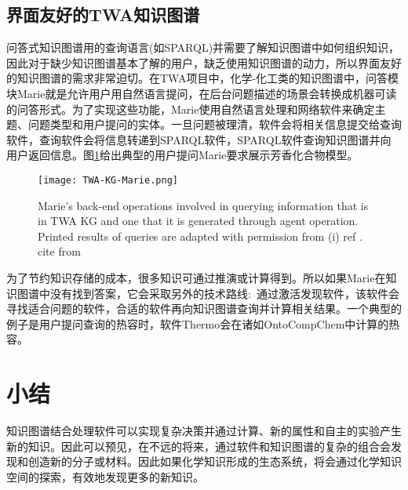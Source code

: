 \subsection{界面友好的\rm{TWA}知识图谱}
问答式知识图谱用的查询语言(如\textrm{SPARQL})并需要了解知识图谱中如何组织知识，因此对于缺少知识图谱基本了解的用户，缺乏使用知识图谱的动力，所以界面友好的知识图谱的需求非常迫切。在\textrm{TWA}项目中，化学-化工类的知识图谱中，问答模块\textrm{Marie}就是允许用户用自然语言提问，在后台问题描述的场景会转换成机器可读的问答形式。为了实现这些功能，\textrm{Marie}使用自然语言处理和网络软件来确定主题、问题类型和用户提问的实体。一旦问题被理清，软件会将相关信息提交给查询软件，查询软件会将信息转递到\textrm{SPARQL}软件，\textrm{SPARQL}软件查询知识图谱并向用户返回信息。图\ref{Fig:TWA-KG-Marie}给出典型的用户提问\textrm{Marie}要求展示芳香化合物模型。
\begin{figure}[h!]
\centering
\texttt{[image: TWA-KG-Marie.png]}
\caption{\small\textrm{Marie's back-end operations involved in querying information that is in TWA KG and one that it is generated through agent operation. Printed results of queries are adapted with permission from (i) ref \cite{JCIM61-3868_2021}. cite from\cite{ACR56-128_2023}}}%
\label{Fig:TWA-KG-Marie}
\end{figure}
为了节约知识存储的成本，很多知识可通过推演或计算得到。所以如果\textrm{Marie}在知识图谱中没有找到答案，它会采取另外的技术路线:~通过激活发现软件，该软件会寻找适合问题的软件，合适的软件再向知识图谱查询并计算相关结果。一个典型的例子是用户提问查询的热容时，软件\textrm{Thermo}会在诸如\textrm{OntoCompChem}中计算的热容。
\section{小结}
知识图谱结合处理软件可以实现复杂决策并通过计算、新的属性和自主的实验产生新的知识。因此可以预见，在不远的将来，通过软件和知识图谱的复杂的组合会发现和创造新的分子或材料。因此如果化学知识形成的生态系统，将会通过化学知识空间的探索，有效地发现更多的新知识。

